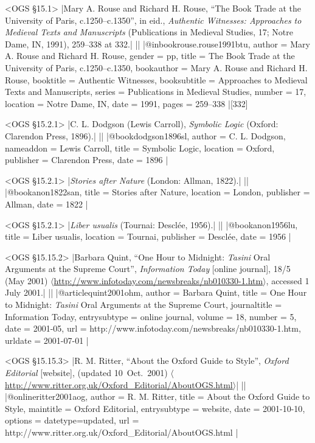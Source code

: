 \documentclass[extrafontsizes,11pt,a4paper,oneside]{memoir}
\begin{document}
\bibexample<OGS \S15.1>
|Mary A. Rouse and Richard H. Rouse, \enquote{The Book Trade at the University of Paris, c.1250--c.1350}, in eid., \emph{Authentic Witnesses: Approaches to Medieval Texts and Manuscripts} (Publications in Medieval Studies, 17; Notre Dame, IN, 1991), 259--338 at 332.|%
||%
|@inbook{rouse.rouse1991btu,
  author = {Mary A. Rouse and Richard H. Rouse},
  gender = {pp},
  title = {The Book Trade at the University of Paris, c.1250--c.1350},
  bookauthor = {Mary A. Rouse and Richard H. Rouse},
  booktitle = {Authentic Witnesses},
  booksubtitle = {Approaches to Medieval Texts and Manuscripts},
  series = {Publications in Medieval Studies},
  number = {17},
  location = {Notre Dame, IN},
  date = {1991},
  pages = {259--338}
}|[332]


\bibexample<OGS \S15.2.1>
|C. L. Dodgson (Lewis Carroll), \emph{Symbolic Logic} (Oxford: Clarendon Press, 1896).|%
||%
|@book{dodgson1896sl,
  author = {C. L. Dodgson},
  nameaddon = {Lewis Carroll},
  title = {Symbolic Logic},
  location = {Oxford},
  publisher = {Clarendon Press},
  date = {1896}
}|

\bibexample<OGS \S15.2.1>
|\emph{Stories after Nature} (London: Allman, 1822).|%
||%
|@book{anon1822san,
  title = {Stories after Nature},
  location = {London},
  publisher = {Allman},
  date = {1822}
}|

\bibexample<OGS \S15.2.1>
|\emph{Liber usualis} (Tournai: Desclée, 1956).|%
||%
|@book{anon1956lu,
  title = {Liber usualis},
  location = {Tournai},
  publisher = {Desclée},
  date = {1956}
}|


\bibexample<OGS \S15.15.2>
|Barbara Quint, \enquote{One Hour to Midnight: \emph{Tasini} Oral Arguments at the Supreme Court}, \emph{Information Today} [online journal], 18/5 (May 2001) $\langle$\url{http://www.infotoday.com/newsbreaks/nb010330-1.htm}$\rangle$, accessed 1 July 2001.|%
||%
|@article{quint2001ohm,
  author = {Barbara Quint},
  title = {One Hour to Midnight: \emph{Tasini} Oral Arguments at the Supreme Court},
  journaltitle = {Information Today},
  entrysubtype = {online journal},
  volume = {18},
  number = {5},
  date = {2001-05},
  url = {http://www.infotoday.com/newsbreaks/nb010330-1.htm},
  urldate = {2001-07-01}
}|

\bibexample<OGS \S15.15.3>
|R. M. Ritter, \enquote{About the Oxford Guide to Style}, \emph{Oxford Editorial} [website], (updated 10~Oct.\ 2001) $\langle$\url{http://www.ritter.org.uk/Oxford_Editorial/AboutOGS.html}$\rangle$|%
||%
|@online{ritter2001aog,
  author = {R. M. Ritter},
  title = {About the Oxford Guide to Style},
  maintitle = {Oxford Editorial},
  entrysubtype = {website},
  date = {2001-10-10},
  options = {datetype=updated},
  url = {http://www.ritter.org.uk/Oxford_Editorial/AboutOGS.html}
}|
\end{document}
